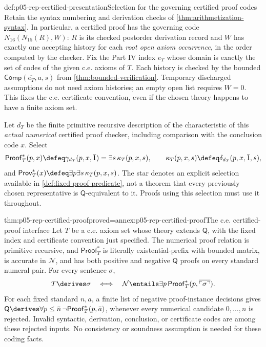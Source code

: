 \begin{hbdefinition}{def:p05-rep-certified-presentation}{Selection for the governing certified proof codes}
Retain the syntax numbering and derivation checks of
\cref{thm:arithmetization-syntax}. In particular, a certified proof has
the governing code \(N_{16}(N_{15}(R),W)\): \(R\) is its checked
postorder derivation record and \(W\) has exactly one accepting history
for each \emph{root open axiom occurrence}, in the order computed by the
checker. Fix the Part IV index \(e_T\) whose domain is exactly the set
of codes of the given c.e. axioms of \(T\). Each history is checked by
the bounded \(\mathsf{Comp}(\overline{e_T},a,s)\) from
\cref{thm:bounded-verification}. Temporary discharged assumptions do not
need axiom histories; an empty open list requires \(W=0\).
This fixes the c.e. certificate convention, even if the chosen theory
happens to have a finite axiom set.

Let \(d_T\) be the finite primitive recursive description of the
characteristic of this \emph{actual numerical} certified proof checker,
including comparison with the conclusion code \(x\). Select
\[
 \mathsf{Proof}^{*}_T(p,x)\defeq\gamma_{d_T}(p,x,\bar1)
                 =\exists s\,\kappa_T(p,x,s),\qquad
 \kappa_T(p,x,s)\defeq\delta_{d_T}(p,x,\bar1,s),
\]
and \(\mathsf{Prov}^{*}_T(x)\defeq\exists p\exists s\,
\kappa_T(p,x,s)\). The star denotes an explicit selection available in
\cref{def:fixed-proof-predicate}, not a theorem that every previously
chosen representative is \(\mathsf Q\)-equivalent to it. Proofs using
this selection must use it throughout.
\end{hbdefinition}

\begin{hbtheorem}{thm:p05-rep-certified-proof}{proved=annex:p05-rep-certified-proof}{The c.e. certified-proof interface}
Let \(T\) be a c.e. axiom set whose theory extends \(\mathsf Q\), with
the fixed index and certificate convention just specified. The numerical
proof relation is primitive recursive, and \(\mathsf{Proof}^{*}_T\)
is literally existential-prefix with bounded matrix, is accurate in
\(\mathcal N\), and has both positive and negative \(\mathsf Q\) proofs
on every standard numeral pair. For every sentence \(\sigma\),
\[
 T\derives\sigma\quad\Longleftrightarrow\quad
 \mathcal N\entails\exists p\,\mathsf{Proof}^{*}_T
                       (p,\overline{\ulcorner\sigma\urcorner}).
\]
For each fixed standard \(n,a\), a finite list of negative proof-instance
decisions gives
\(\mathsf Q\derives\forall p\leq\bar n\,
\neg\mathsf{Proof}^{*}_T(p,\bar a)\), whenever every numerical
candidate \(0,\ldots,n\) is rejected. Invalid syntactic, derivation,
conclusion, or certificate codes are among these rejected inputs.
No consistency or soundness assumption is needed for these coding facts.
\end{hbtheorem}

